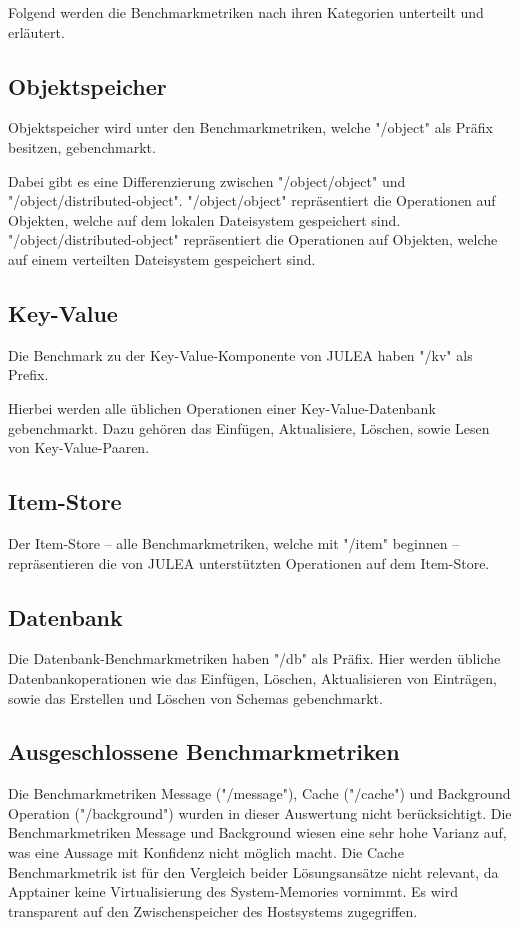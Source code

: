 Folgend werden die Benchmarkmetriken nach ihren Kategorien unterteilt und erläutert.

\subsection{Objektspeicher}

Objektspeicher wird unter den Benchmarkmetriken, welche "/object" als Präfix besitzen, gebenchmarkt.

Dabei gibt es eine Differenzierung zwischen "/object/object" und "/object/distributed-object". "/object/object" repräsentiert die Operationen auf Objekten, welche auf dem lokalen Dateisystem gespeichert sind. "/object/distributed-object" repräsentiert die Operationen auf Objekten, welche auf einem verteilten Dateisystem gespeichert sind. 

\subsection{Key-Value}

Die Benchmark zu der Key-Value-Komponente von JULEA haben "/kv" als Prefix. 

Hierbei werden alle üblichen Operationen einer Key-Value-Datenbank gebenchmarkt. Dazu gehören das Einfügen, Aktualisiere, Löschen, sowie Lesen von Key-Value-Paaren.

\subsection{Item-Store}

Der Item-Store – alle Benchmarkmetriken, welche mit "/item" beginnen – repräsentieren die von JULEA unterstützten Operationen auf dem Item-Store.

\subsection{Datenbank}

Die Datenbank-Benchmarkmetriken haben "/db" als Präfix. Hier werden übliche Datenbankoperationen wie das Einfügen, Löschen, Aktualisieren von Einträgen, sowie das Erstellen und Löschen von Schemas gebenchmarkt.

\subsection{Ausgeschlossene Benchmarkmetriken}

Die Benchmarkmetriken Message ("/message"), Cache ("/cache") und Background Operation ("/background") wurden in dieser Auswertung nicht berücksichtigt. Die Benchmarkmetriken Message und Background wiesen eine sehr hohe Varianz auf, was eine Aussage mit Konfidenz nicht möglich macht. Die Cache Benchmarkmetrik ist für den Vergleich beider Lösungsansätze nicht relevant, da Apptainer keine Virtualisierung des System-Memories vornimmt. Es wird transparent auf den Zwischenspeicher des Hostsystems zugegriffen.   

